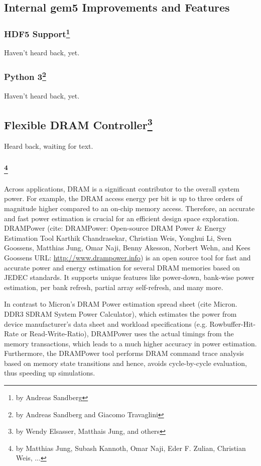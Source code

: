 \subsection{Internal gem5 Improvements and Features}

\subsubsection[HDF5 Support]{HDF5 Support\footnote{by Andreas Sandberg}}

Haven't heard back, yet.

\subsubsection[Python 3]{Python 3\footnote{by Andreas Sandberg and Giacomo Travaglini}}

Haven't heard back, yet.

\subsection[Flexible DRAM Controller]{Flexible DRAM Controller\footnote{by Wendy Elsasser, Matthais Jung, and others}}

Heard back, waiting for text.

\subsubsection[DRAMPower and DRAM Power-Down Modes]{\footnote{by Matthias Jung, Subash Kannoth, Omar Naji, Eder F. Zulian, Christian Weis, ...}}

Across applications, DRAM is a significant contributor to the overall system power.
For example, the DRAM access energy per bit is up to three orders of magnitude higher compared to an on-chip memory access.
Therefore, an accurate and fast power estimation is crucial for an efficient design space exploration.
DRAMPower (cite: DRAMPower: Open-source DRAM Power \& Energy Estimation Tool Karthik Chandrasekar, Christian Weis, Yonghui Li, Sven Goossens, Matthias Jung, Omar Naji, Benny Akesson, Norbert Wehn, and Kees Goossens URL: \url{http://www.drampower.info}) is an open source tool for fast and accurate power and energy estimation for several DRAM memories based on JEDEC standards.
It supports unique features like power-down, bank-wise power estimation, per bank refresh, partial array self-refresh, and many more.

In contrast to Micron’s DRAM Power estimation spread sheet (cite Micron. DDR3 SDRAM System Power Calculator), which estimates the power from device manufacturer’s data sheet and workload specifications (e.g. Rowbuffer-Hit-Rate or Read-Write-Ratio), DRAMPower uses the actual timings from the memory transactions, which leads to a much higher accuracy in power estimation.
Furthermore, the DRAMPower tool performs DRAM command trace analysis based on memory state transitions and hence, avoids cycle-by-cycle evaluation, thus speeding up simulations.

